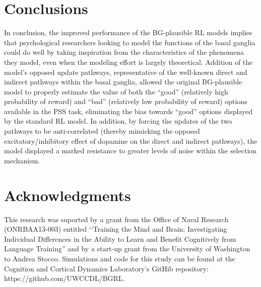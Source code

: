 \documentclass[10pt,letterpaper]{article}
\begin{document}
\section{Conclusions}

In conclusion, the improved performance of the BG-plausible RL models implies that psychological researchers looking to model the functions of the basal ganglia could do well by taking inspiration from the characteristics of the phenomena they model, even when the modeling effort is largely theoretical. Addition of the model’s opposed update pathways, representative of the well-known direct and indirect pathways within the basal ganglia, allowed the original BG-plausible model to properly estimate the value of both the ``good'' (relatively high probability of reward) and ``bad'' (relatively low probability of reward) options available in the PSS task, eliminating the bias towards ``good'' options displayed by the standard RL model. In addition, by forcing the updates of the two pathways to be anti-correlated (thereby mimicking the opposed excitatory/inhibitory effect of dopamine on the direct and indirect pathways), the model displayed a marked resistance to greater levels of noise within the selection mechanism.    

\section{Acknowledgments}

This research was suported by a grant from the Office of Naval Research (ONRBAA13-003) entitled ‘‘Training the Mind and Brain: Investigating Individual Differences in the Ability to Learn and Benefit Cognitively from Language Training'' and by a start-up grant from the University of Washington to Andrea Stocco. Simulations and code for this study can be found at the Cognition and Cortical Dynamics Laboratory's GitHib repository: https://github.com/UWCCDL/BGRL.



\setlength{\bibleftmargin}{.125in}
\setlength{\bibindent}{-\bibleftmargin}


\end{document}
